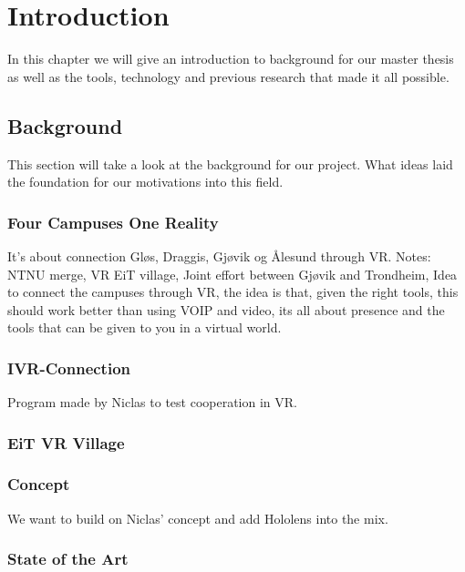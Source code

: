 \chapter{Introduction}
\label{chap:introduction}
In this chapter we will give an introduction to background for our master thesis as well as the tools, technology and previous research that made it all possible. 

\section{Background}
    This section will take a look at the background for our project. What ideas laid the foundation for our motivations into this field.

    \subsection{Four Campuses One Reality}
    It's about connection Gløs, Draggis, Gjøvik og Ålesund through VR.
    Notes: NTNU merge, VR EiT village, Joint effort between Gjøvik and Trondheim, Idea to connect the campuses through VR, the idea is that, given the right tools, this should work better than using VOIP and video, its all about presence and the tools that can be given to you in a virtual world.

    \subsection{IVR-Connection}
    Program made by Niclas to test cooperation in VR.
    
    \subsection{EiT VR Village}

    \subsection{Concept}
    We want to build on Niclas' concept and add Hololens into the mix.
    
    \subsection{State of the Art}

